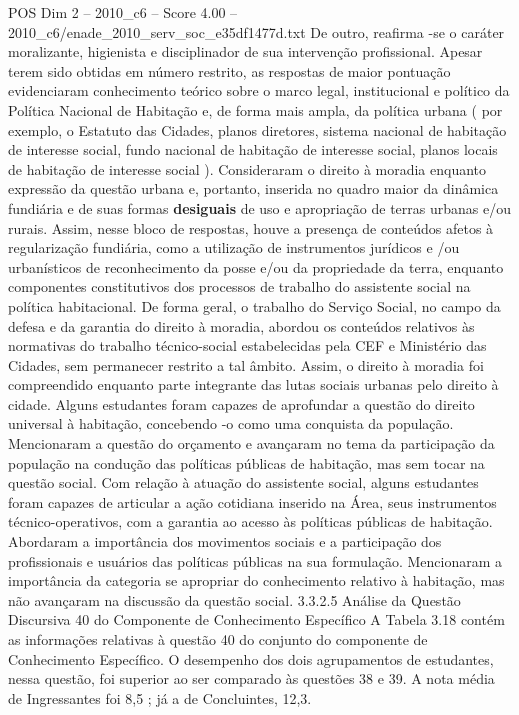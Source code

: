 \begin{textsample}{POS Dim 2 – 2010\_c6 – Score 4.00 – 2010\_c6/enade\_2010\_serv\_soc\_e35df1477d.txt}
De outro, reafirma -se o caráter moralizante, higienista e disciplinador de sua intervenção profissional.
Apesar terem sido obtidas em número restrito, as respostas de maior pontuação evidenciaram conhecimento teórico sobre o marco legal, institucional e político da Política Nacional de Habitação e, de forma mais ampla, da política urbana ( por exemplo, o Estatuto das Cidades, planos diretores, sistema nacional de habitação de interesse social, fundo nacional de habitação de interesse social, planos locais de habitação de interesse social ).
Consideraram o direito à moradia enquanto expressão da questão urbana e, portanto, inserida no quadro maior da dinâmica fundiária e de suas formas \textbf{desiguais} de uso e apropriação de terras urbanas e/ou rurais.
Assim, nesse bloco de respostas, houve a presença de conteúdos afetos à regularização fundiária, como a utilização de instrumentos jurídicos e /ou urbanísticos de reconhecimento da posse e/ou da propriedade da terra, enquanto componentes constitutivos dos processos de trabalho do assistente social na política habitacional.
De forma geral, o trabalho do Serviço Social, no campo da defesa e da garantia do direito à moradia, abordou os conteúdos relativos às normativas do trabalho técnico-social estabelecidas pela CEF e Ministério das Cidades, sem permanecer restrito a tal âmbito.
Assim, o direito à moradia foi compreendido enquanto parte integrante das lutas sociais urbanas pelo direito à cidade.
Alguns estudantes foram capazes de aprofundar a questão do direito universal à habitação, concebendo -o como uma conquista da população.
Mencionaram a questão do orçamento e avançaram no tema da participação da população na condução das políticas públicas de habitação, mas sem tocar na questão social.
Com relação à atuação do assistente social, alguns estudantes foram capazes de articular a ação cotidiana inserido na Área, seus instrumentos técnico-operativos, com a garantia ao acesso às políticas públicas de habitação.
Abordaram a importância dos movimentos sociais e a participação dos profissionais e usuários das políticas públicas na sua formulação.
Mencionaram a importância da categoria se apropriar do conhecimento relativo à habitação, mas não avançaram na discussão da questão social. 3.3.2.5 Análise da Questão Discursiva 40 do Componente de Conhecimento Específico A Tabela 3.18 contém as informações relativas à questão 40 do conjunto do componente de Conhecimento Específico.
O desempenho dos dois agrupamentos de estudantes, nessa questão, foi superior ao ser comparado às questões 38 e 39.
A nota média de Ingressantes foi 8,5 ; já a de Concluintes, 12,3.

\end{textsample}
